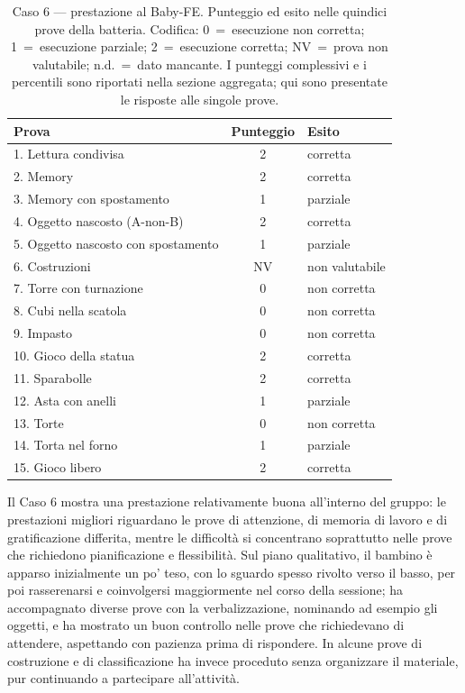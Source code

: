 \begin{table}[htbp]
\centering
\caption[Caso 6 --- prestazione al Baby-FE]{Caso 6 --- prestazione al Baby-FE. Punteggio ed esito nelle quindici prove della batteria. Codifica: 0~=~esecuzione non corretta; 1~=~esecuzione parziale; 2~=~esecuzione corretta; NV~=~prova non valutabile; n.d.~=~dato mancante. I punteggi complessivi e i percentili sono riportati nella sezione aggregata; qui sono presentate le risposte alle singole prove.}
\label{tab:caso6_prove}
\begin{tabular}{|l|c|l|}
\toprule
\textbf{Prova} & \textbf{Punteggio} & \textbf{Esito} \\
\midrule
1. Lettura condivisa & 2 & corretta \\
2. Memory & 2 & corretta \\
3. Memory con spostamento & 1 & parziale \\
4. Oggetto nascosto (A-non-B) & 2 & corretta \\
5. Oggetto nascosto con spostamento & 1 & parziale \\
6. Costruzioni & NV & non valutabile \\
7. Torre con turnazione & 0 & non corretta \\
8. Cubi nella scatola & 0 & non corretta \\
9. Impasto & 0 & non corretta \\
10. Gioco della statua & 2 & corretta \\
11. Sparabolle & 2 & corretta \\
12. Asta con anelli & 1 & parziale \\
13. Torte & 0 & non corretta \\
14. Torta nel forno & 1 & parziale \\
15. Gioco libero & 2 & corretta \\
\bottomrule
\end{tabular}
\end{table}

Il Caso 6 mostra una prestazione relativamente buona all'interno del gruppo: le prestazioni migliori riguardano le prove di attenzione, di memoria di lavoro e di gratificazione differita, mentre le difficoltà si concentrano soprattutto nelle prove che richiedono pianificazione e flessibilità. Sul piano qualitativo, il bambino è apparso inizialmente un po' teso, con lo sguardo spesso rivolto verso il basso, per poi rasserenarsi e coinvolgersi maggiormente nel corso della sessione; ha accompagnato diverse prove con la verbalizzazione, nominando ad esempio gli oggetti, e ha mostrato un buon controllo nelle prove che richiedevano di attendere, aspettando con pazienza prima di rispondere. In alcune prove di costruzione e di classificazione ha invece proceduto senza organizzare il materiale, pur continuando a partecipare all'attività.

